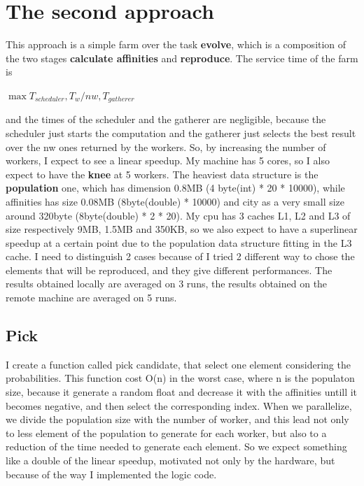 \documentclass{article}
\begin{document}
    \section{The second approach}\label{sec:s3}
	This approach is a simple farm over the task \textbf{evolve}, which is a composition of the two stages \textbf{calculate affinities} and \textbf{reproduce}.
The service time of the farm is

	\centerline{$\max{T_{scheduler}, T_{w}/nw, T_{gatherer}}$}

    and the times of the scheduler and the gatherer are negligible, because the scheduler just starts the computation and the gatherer just selects the best result over the nw ones returned by the workers. So, by increasing the number of workers, I expect to see a linear speedup. My machine has 5 cores, so I also expect to have the \textbf{knee} at 5 workers. The heaviest data structure is the \textbf{population} one, which has dimension 0.8MB (4 byte(int) * 20 * 10000), while affinities has size 0.08MB (8byte(double) * 10000) and city as a very small size around 320byte (8byte(double) * 2 * 20). My cpu has 3 caches L1, L2 and L3 of size respectively 9MB, 1.5MB and 350KB, so we also expect to have a superlinear speedup at a certain point due to the population data structure fitting in the L3 cache. 
    I need to distinguish 2 cases because of I tried 2 different way to chose the elements that will be reproduced, and they give different performances. The results obtained locally are averaged on 3 runs, the results obtained on the remote machine are averaged on 5 runs.

	\subsection{Pick}\label{sec:s31}
I create a function called pick candidate, that select one element considering the probabilities. This function cost O(n) in the worst case, where n is the populaton size, because it generate a random float and decrease it with the affinities untill it becomes negative, and then select the corresponding index. When we parallelize, we divide the population size with the number of worker, and this lead not only to less element of the population to generate for each worker, but also to a reduction of the time needed to generate each element. So we expect something like a double of the linear speedup, motivated not only by the hardware, but because of the way I implemented the logic code.
\end{document}
